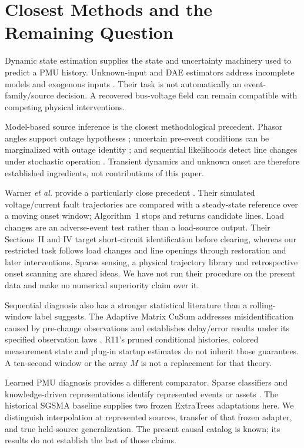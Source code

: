 \section{Closest Methods and the Remaining Question}
\label{sec:narrative-related}

Dynamic state estimation supplies the state and uncertainty machinery used to predict a PMU history. Unknown-input and DAE estimators address incomplete models and exogenous inputs \cite{gillijns2007input,nugroho2022dae,katanic2024recursive}. Their task is not automatically an event-family/source decision. A recovered bus-voltage field can remain compatible with competing physical interventions.

Model-based source inference is the closest methodological precedent. Phasor angles support outage hypotheses \cite{tate2008outage}; uncertain pre-event conditions can be marginalized with outage identity \cite{zhao2014outages}; and sequential likelihoods detect line changes under stochastic operation \cite{chen2016quickest,rovatsos2017outage}. Transient dynamics and unknown onset are therefore established ingredients, not contributions of this paper.

Warner \emph{et al.} provide a particularly close precedent \cite{warner2023highfidelity}. Their simulated voltage/current fault trajectories are compared with a steady-state reference over a moving onset window; Algorithm~1 stops and returns candidate lines. Load changes are an adverse-event test rather than a load-source output. Their Sections~II and IV target short-circuit identification before clearing, whereas our restricted task follows load changes and line openings through restoration and later interventions. Sparse sensing, a physical trajectory library and retrospective onset scanning are shared ideas. We have not run their procedure on the present data and make no numerical superiority claim over it.

Sequential diagnosis also has a stronger statistical literature than a rolling-window label suggests. The Adaptive Matrix CuSum addresses misidentification caused by pre-change observations and establishes delay/error results under its specified observation laws \cite{warner2024matrix}. R11's pruned conditional histories, colored measurement state and plug-in startup estimates do not inherit those guarantees. A ten-second window or the array $M$ is not a replacement for that theory.

Learned PMU diagnosis provides a different comparator. Sparse classifiers and knowledge-driven representations identify represented events or assets \cite{pandey2020realtime,li2024knowledge,yildiz2024few}. The historical SGSMA baseline supplies two frozen ExtraTrees adaptations here. We distinguish interpolation at represented sources, transfer of that frozen adapter, and true held-source generalization. The present causal catalog is known; its results do not establish the last of those claims.

